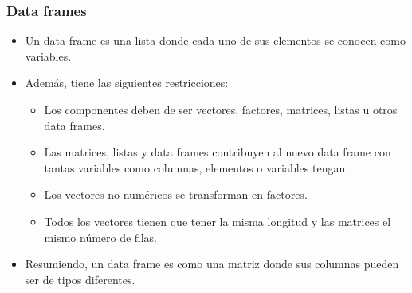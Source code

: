 \documentclass{beamer}
\begin{document}
\begin{frame}
\frametitle{Data frames}
\begin{itemize}
\item Un data frame es una lista donde cada uno de sus elementos se conocen como variables.
\item Además, tiene las siguientes restricciones:
\begin{itemize}
\item Los componentes deben de ser vectores, factores, matrices, listas u otros data frames.
\item Las matrices, listas y data frames contribuyen al nuevo data frame con tantas variables como columnas, elementos o variables tengan.
\item Los vectores no numéricos se transforman en factores.
\item Todos los vectores tienen que tener la misma longitud y las matrices el mismo número de filas.
\end{itemize}
\item Resumiendo, un data frame es como una matriz donde sus columnas pueden ser de tipos diferentes.
\end{itemize}
\end{frame}
\end{document}
